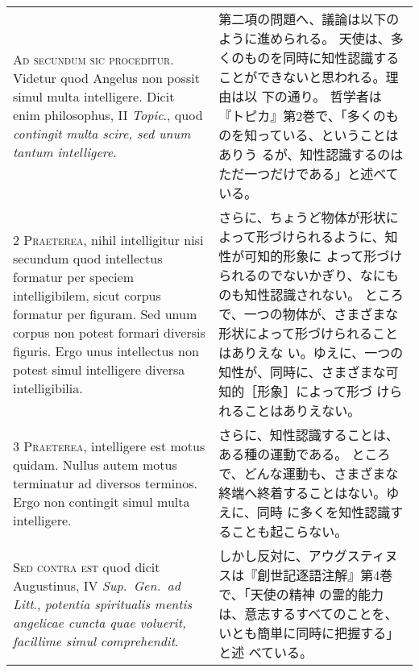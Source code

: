 \documentclass[10pt]{jsarticle} %
\begin{document}
\begin{longtable}{p{21em}p{21em}}

{\Huge A}{\scshape d secundum sic proceditur}. Videtur quod
Angelus non possit simul multa intelligere. Dicit enim philosophus, II
{\itshape Topic}., quod {\itshape contingit multa scire, sed unum tantum intelligere}.


&


第二項の問題へ、議論は以下のように進められる。
天使は、多くのものを同時に知性認識することができないと思われる。理由は以
 下の通り。
哲学者は『トピカ』第2巻で、「多くのものを知っている、ということはありう
 るが、知性認識するのはただ一つだけである」と述べている。

\\


{\scshape 2 Praeterea}, nihil intelligitur nisi secundum
quod intellectus formatur per speciem intelligibilem, sicut corpus
formatur per figuram. Sed unum corpus non potest formari diversis
figuris. Ergo unus intellectus non potest simul intelligere diversa
intelligibilia.


&

さらに、ちょうど物体が形状によって形づけられるように、知性が可知的形象に
 よって形づけられるのでないかぎり、なにものも知性認識されない。
ところで、一つの物体が、さまざまな形状によって形づけられることはありえな
 い。ゆえに、一つの知性が、同時に、さまざまな可知的［形象］によって形づ
 けられることはありえない。


\\


{\scshape 3 Praeterea}, intelligere est motus
quidam. Nullus autem motus terminatur ad diversos terminos. Ergo non
contingit simul multa intelligere.


&


さらに、知性認識することは、ある種の運動である。
ところで、どんな運動も、さまざまな終端へ終着することはない。ゆえに、同時
 に多くを知性認識することも起こらない。

\\


{\scshape Sed contra est} quod dicit Augustinus, IV
{\itshape Sup.~Gen.~ad Litt}., {\itshape potentia spiritualis mentis angelicae cuncta quae
voluerit, facillime simul comprehendit}.


&


しかし反対に、アウグスティヌスは『創世記逐語注解』第4巻で、「天使の精神
 の霊的能力は、意志するすべてのことを、いとも簡単に同時に把握する」と述
 べている。

\\



\end{longtable}
\end{document}
